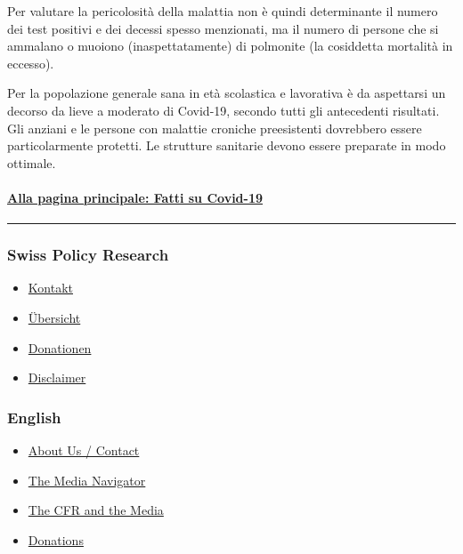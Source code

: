 Per valutare la pericolosità della malattia non è quindi determinante il
numero dei test positivi e dei decessi spesso menzionati, ma il numero
di persone che si ammalano o muoiono (inaspetta­ta­mente) di polmonite
(la cosiddetta mortalità in eccesso).

Per la popolazione generale sana in età scolastica e lavorativa è da
aspettarsi un decorso da lieve a moderato di Covid-19, secondo tutti gli
antecedenti risultati. Gli anziani e le persone con malattie croniche
preesistenti dovrebbero essere particolarmente protetti. Le strutture
sanitarie devono essere preparate in modo ottimale.

\hypertarget{alla-pagina-principale-fatti-su-covid-19-1}{%
\paragraph{\texorpdfstring{\href{https://swprs.org/un-medico-svizzero-su-covid-19/}{Alla
pagina principale: Fatti su
Covid-19}}{Alla pagina principale: Fatti su Covid-19}}\label{alla-pagina-principale-fatti-su-covid-19-1}}

\begin{center}\rule{0.5\linewidth}{\linethickness}\end{center}

\hypertarget{swiss-policy-research}{%
\subsubsection{Swiss Policy Research}\label{swiss-policy-research}}

\begin{itemize}
\tightlist
\item
  \href{https://swprs.org/kontakt/}{Kontakt}
\item
  \href{https://swprs.org/uebersicht/}{Übersicht}
\item
  \href{https://swprs.org/donationen/}{Donationen}
\item
  \href{https://swprs.org/disclaimer/}{Disclaimer}
\end{itemize}

\hypertarget{english}{%
\subsubsection{English}\label{english}}

\begin{itemize}
\tightlist
\item
  \href{https://swprs.org/contact/}{About Us / Contact}
\item
  \href{https://swprs.org/media-navigator/}{The Media Navigator}
\item
  \href{https://swprs.org/the-american-empire-and-its-media/}{The CFR
  and the Media}
\item
  \href{https://swprs.org/donations/}{Donations}
\end{itemize}

